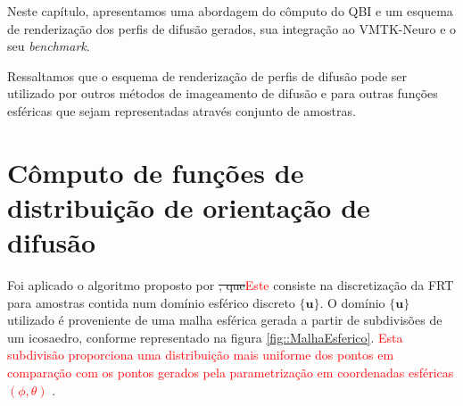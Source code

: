 \documentclass[
    12pt,                %
    oneside,            %
    a4paper,            %
    english,            %
    french,                %
    spanish,            %
    brazil                %
    ]{abntex2}
\begin{document}

Neste capítulo, apresentamos uma abordagem do cômputo do QBI e um esquema de renderização dos perfis de difusão gerados, sua integração ao VMTK-Neuro e o seu \textit{benchmark}.

Ressaltamos que o esquema de renderização de perfis de difusão pode ser utilizado por outros métodos de imageamento de difusão e para outras funções esféricas que sejam representadas através conjunto de amostras.


\section{Cômputo de funções de distribuição de orientação de difusão}

Foi aplicado o algoritmo proposto por \sout{, que}\textcolor{red}{Este} consiste na discretização da FRT para amostras contida num domínio esférico discreto $\{\textbf{u}\}$. O domínio $\{\textbf{u}\}$ utilizado é proveniente de uma malha esférica gerada a partir de subdivisões de um icosaedro, conforme representado na figura \ref{fig::MalhaEsferico}.
\textcolor{red}{Esta subdivisão proporciona uma distribuição mais uniforme dos pontos em comparação com os pontos gerados pela parametrização em coordenadas esféricas $(\phi, \theta)$ \cite{TuchQBall2004, descoteaux2007_QBI, yeh2010}}.

\end{document}
